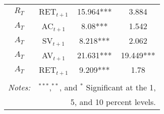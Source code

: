 \begin{table}[!htbp]
\begin{adjustbox}{center,max height=\totalheight}
\begin{tabular}{cccc}
$R_{T}$ & RET$_{t+1}$ & 15.964*** & 3.884 \\
$A_{T}$ & AC$_{t+1}$ & 8.08*** & 1.542 \\
$A_{T}$ & SV$_{t+1}$ & 8.218*** & 2.062 \\
$A_{T}$ & AV$_{t+1}$ & 21.631*** & 19.449*** \\
$A_{T}$ & RET$_{t+1}$ & 9.209*** & 1.78\\
			  \hline\\
			  \textit{Notes:} & \multicolumn{3}{r}{$^{***}$,$^{**}$, and $^{*}$ Significant at the 1,} \\ 
			  & \multicolumn{3}{r}{ 5, and 10 percent levels.}
		\end{tabular}
	\end{adjustbox}
%		
\end{table}